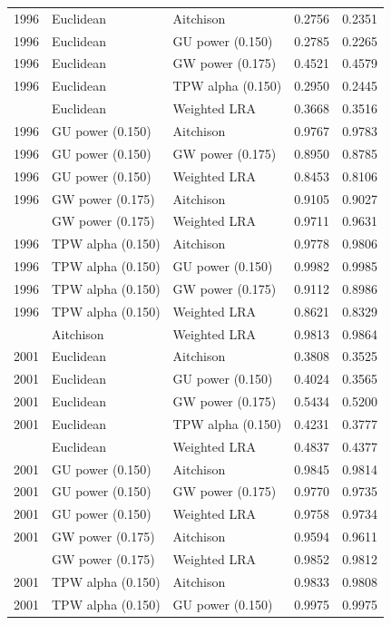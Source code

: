 \begin{longtable}[t]{rllrr}
1996 & Euclidean & Aitchison & 0.2756 & 0.2351\\
1996 & Euclidean & GU power (0.150) & 0.2785 & 0.2265\\
1996 & Euclidean & GW power (0.175) & 0.4521 & 0.4579\\
1996 & Euclidean & TPW alpha (0.150) & 0.2950 & 0.2445\\
\addlinespace
1996 & Euclidean & Weighted LRA & 0.3668 & 0.3516\\
1996 & GU power (0.150) & Aitchison & 0.9767 & 0.9783\\
1996 & GU power (0.150) & GW power (0.175) & 0.8950 & 0.8785\\
1996 & GU power (0.150) & Weighted LRA & 0.8453 & 0.8106\\
1996 & GW power (0.175) & Aitchison & 0.9105 & 0.9027\\
\addlinespace
1996 & GW power (0.175) & Weighted LRA & 0.9711 & 0.9631\\
1996 & TPW alpha (0.150) & Aitchison & 0.9778 & 0.9806\\
1996 & TPW alpha (0.150) & GU power (0.150) & 0.9982 & 0.9985\\
1996 & TPW alpha (0.150) & GW power (0.175) & 0.9112 & 0.8986\\
1996 & TPW alpha (0.150) & Weighted LRA & 0.8621 & 0.8329\\
\addlinespace
2001 & Aitchison & Weighted LRA & 0.9813 & 0.9864\\
2001 & Euclidean & Aitchison & 0.3808 & 0.3525\\
2001 & Euclidean & GU power (0.150) & 0.4024 & 0.3565\\
2001 & Euclidean & GW power (0.175) & 0.5434 & 0.5200\\
2001 & Euclidean & TPW alpha (0.150) & 0.4231 & 0.3777\\
\addlinespace
2001 & Euclidean & Weighted LRA & 0.4837 & 0.4377\\
2001 & GU power (0.150) & Aitchison & 0.9845 & 0.9814\\
2001 & GU power (0.150) & GW power (0.175) & 0.9770 & 0.9735\\
2001 & GU power (0.150) & Weighted LRA & 0.9758 & 0.9734\\
2001 & GW power (0.175) & Aitchison & 0.9594 & 0.9611\\
\addlinespace
2001 & GW power (0.175) & Weighted LRA & 0.9852 & 0.9812\\
2001 & TPW alpha (0.150) & Aitchison & 0.9833 & 0.9808\\
2001 & TPW alpha (0.150) & GU power (0.150) & 0.9975 & 0.9975\\

\end{longtable}
